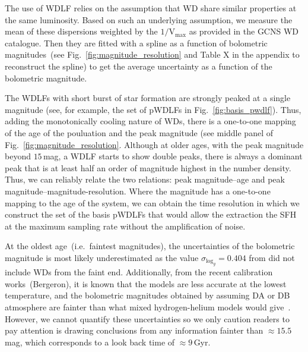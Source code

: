\documentclass[fleqn,usenatbib]{mnras}
\begin{document}
The use of WDLF relies on the assumption that WD share similar properties
at the same luminosity. Based on such an underlying assumption, we measure
the mean of these dispersions weighted by the $1/\mathrm{V}_{\mathrm{max}}$
as provided in the GCNS WD catalogue. Then they are fitted with a spline as
a function of bolometric magnitudes~(see Fig.~\ref{fig:magnitude_resolution}
and Table X in the appendix to reconstruct the spline) to get the average 
uncertainty as a function of the bolometric magnitude.

The WDLFs with short burst of star formation are strongly peaked at a single
magnitude (see, for example, the set of pWDLFs in Fig.~\ref{fig:basis_pwdlf}).
Thus, adding the monotonically cooling nature of WDs, there is a one-to-one
mapping of the age of the pouluation and the peak magnitude (see middle panel
of Fig.~\ref{fig:magnitude_resolution}. Although at older ages, with the peak
magnitude beyond $15$\,mag, a WDLF starts to show double peaks, there is always
a dominant peak that is at least half an order of magnitude highest in the
number density. Thus, we can reliably relate the two relations: peak
magnitude--age and peak magnitude--magnitude-resolution. Where the magnitude
has a one-to-one mapping to the age of the system, we can obtain the time
resolution in which we construct the set of the basis pWDLFs that would allow
the extraction the SFH at the maximum sampling rate without the amplification
of noise.

At the oldest age~(i.e.\ faintest magnitudes), the uncertainties of the
bolometric magnitude is most likely underestimated as the value
$\sigma_{\mathrm{log}_{g}} = 0.404$ from \citet{2014ApJ...796..128G} did not
include WDs from the faint end. Additionally, from the recent calibration
works~(Bergeron), it is known that the models are less accurate at the lowest 
temperature, and the bolometric magnitudes obtained by assuming DA or DB
atmosphere are fainter than what mixed hydrogen-helium models would
give~\citep{2022ApJ...934...36B}. However, we cannot quantify these uncertainties
so we only caution readers to pay attention is drawing conclusions from any
information fainter than $\approx15.5$\,mag, which corresponds to a look back
time of $\approx9$\,Gyr.
\end{document}
